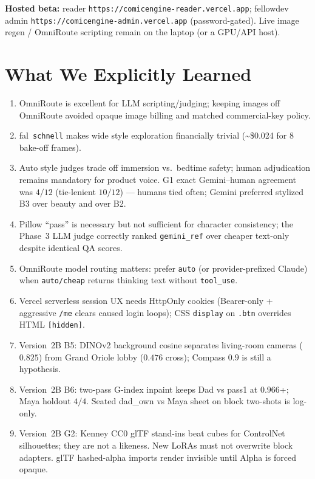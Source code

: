 \documentclass[10pt,twocolumn,letterpaper]{article}
\begin{document}
\textbf{Hosted beta:} reader \texttt{https://comicengine-reader.vercel.app}; fellowdev admin \texttt{https://comicengine-admin.vercel.app} (password-gated). Live image regen / OmniRoute scripting remain on the laptop (or a GPU/API host).

\section{What We Explicitly Learned}
\begin{enumerate}[leftmargin=*,itemsep=2pt]
  \item OmniRoute is excellent for LLM scripting/judging; keeping images off OmniRoute avoided opaque image billing and matched commercial-key policy.
  \item fal~\texttt{schnell} makes wide style exploration financially trivial (\textasciitilde\$0.024 for 8 bake-off frames).
  \item Auto style judges trade off immersion vs.\ bedtime safety; human adjudication remains mandatory for product voice. G1 exact Gemini--human agreement was $4/12$ (tie-lenient $10/12$) --- humans tied often; Gemini preferred stylized B3 over beauty and over B2.
  \item Pillow ``pass'' is necessary but not sufficient for character consistency; the Phase~3 LLM judge correctly ranked \texttt{gemini\_ref} over cheaper text-only despite identical QA scores.
  \item OmniRoute model routing matters: prefer \texttt{auto} (or provider-prefixed Claude) when \texttt{auto/cheap} returns thinking text without \texttt{tool\_use}.
  \item Vercel serverless session UX needs HttpOnly cookies (Bearer-only + aggressive \texttt{/me} clears caused login loops); CSS \texttt{display} on \texttt{.btn} overrides HTML \texttt{[hidden]}.
  \item Version~2B B5: DINOv2 background cosine separates living-room cameras ($0.825$) from Grand Oriole lobby ($0.476$ cross); Compass $0.9$ is still a hypothesis.
  \item Version~2B B6: two-pass G-index inpaint keeps Dad vs pass1 at $0.966$+; Maya holdout $4/4$. Seated dad\_own vs Maya sheet on block two-shots is log-only.
  \item Version~2B G2: Kenney CC0 glTF stand-ins beat cubes for ControlNet silhouettes; they are not a likeness. New LoRAs must not overwrite block adapters. glTF hashed-alpha imports render invisible until Alpha is forced opaque.
\end{enumerate}
\end{document}
